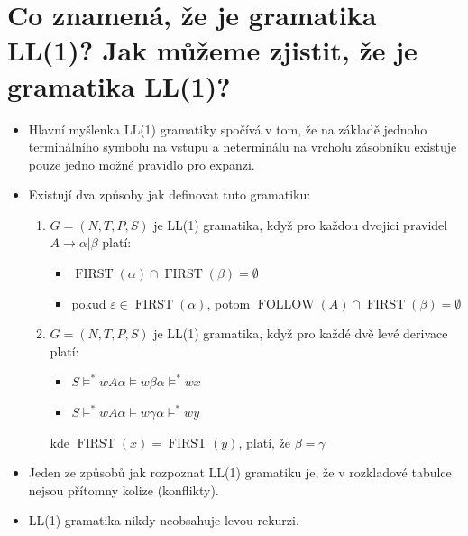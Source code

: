 \documentclass{article}
\begin{document}
\section{Co znamená, že je gramatika LL(1)? Jak můžeme zjistit, že je gramatika LL(1)?}
\begin{itemize}
  \item Hlavní myšlenka LL(1) gramatiky spočívá v tom, že na základě jednoho terminálního symbolu na vstupu a neterminálu na vrcholu zásobníku existuje pouze jedno možné pravidlo pro expanzi.
  \item Existují dva způsoby jak definovat tuto gramatiku:
  \begin{enumerate}
    \item $G = ( N, T, P, S)$ je LL(1) gramatika, když pro každou dvojici pravidel $A \rightarrow \alpha | \beta $ platí:
    \begin{itemize}
        \item $\operatorname{FIRST} (\alpha) \cap \operatorname{FIRST} (\beta) =  \emptyset$
        \item pokud $\varepsilon \in \operatorname{FIRST} (\alpha)$, potom $\operatorname{FOLLOW}(A) \cap \operatorname{FIRST} (\beta) = \emptyset$
    \end{itemize}
    \item $G = ( N, T, P, S)$ je LL(1) gramatika, když pro každé dvě levé derivace platí:
    \begin{itemize}
        \item $S \models^*wA\alpha \models w\beta\alpha \models^* wx$
        \item $S \models^*wA\alpha \models w\gamma\alpha \models^* wy$
    \end{itemize}
    kde $\operatorname{FIRST}(x) = \operatorname{FIRST} (y)$, platí, že $ \beta = \gamma$
    
  \end{enumerate}
  \item Jeden ze způsobů jak rozpoznat LL(1) gramatiku je, že v rozkladové tabulce nejsou přítomny kolize (konflikty).
  \item LL(1) gramatika nikdy neobsahuje levou rekurzi.
\end{itemize}
\newpage
\end{document}
